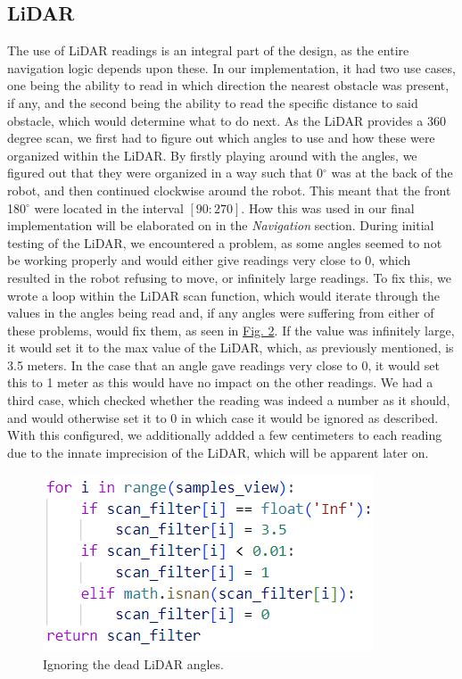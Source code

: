 \documentclass[conference]{IEEEtran}
\begin{document}
\subsection{LiDAR}
The use of LiDAR readings is an integral part of the design, as the entire navigation logic depends upon these.
In our implementation, it had two use cases, one being the ability to read in which direction the nearest obstacle was present, if any, and the second being the ability to read the specific distance to said obstacle, which would determine what to do next.
As the LiDAR provides a 360 degree scan, we first had to figure out which angles to use and how these were organized within the LiDAR.
By firstly playing around with the angles, we figured out that they were organized in a way such that 0$^\circ$ was at the back of the robot, and then continued clockwise around the robot.
This meant that the front 180$^\circ$ were located in the interval $[90:270]$. How this was used in our final implementation will be elaborated on in the \textit{Navigation} section.
During initial testing of the LiDAR, we encountered a problem, as some angles seemed to not be working properly and would either give readings very close to 0, which resulted in the robot refusing to move, or infinitely large readings.
To fix this, we wrote a loop within the LiDAR scan function, which would iterate through the values in the angles being read and, if any angles were suffering from either of these problems, would fix them, as seen in \href{sec:lidar}{Fig. 2}.
If the value was infinitely large, it would set it to the max value of the LiDAR, which, as previously mentioned, is 3.5 meters.
In the case that an angle gave readings very close to 0, it would set this to 1 meter as this would have no impact on the other readings.
We had a third case, which checked whether the reading was indeed a number as it should, and would otherwise set it to 0 in which case it would be ignored as described.
With this configured, we additionally addded a few centimeters to each reading due to the innate imprecision of the LiDAR, which will be apparent later on.
\begin{figure}[htbp]
    \centerline{\includegraphics[width=0.6\columnwidth\hspace{-1.3cm}]{Pictures/LiDARhvid.png}}
    \caption{Ignoring the dead LiDAR angles.}
    \label{sec:lidar}
    \end{figure}
\end{document}
